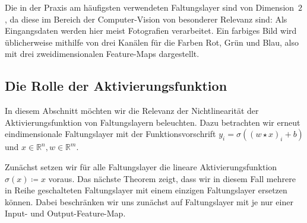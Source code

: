 \documentclass[paper=a4, 	%
		fontsize=11pt,
		abstract=true, 	%
		headsepline, 	%
		notitlepage	%
		]{scrartcl}
\theoremstyle{definition}
\newcommand{\R}{\mathbb{R}}
\begin{document}
\medskip

Die in der Praxis am häufigsten verwendeten Faltungslayer sind von Dimension~$2$, da diese im Bereich der Computer-Vision von besonderer Relevanz sind:
Als Eingangsdaten werden hier meist Fotografien verarbeitet.
Ein farbiges Bild wird üblicherweise mithilfe von drei Kanälen für die Farben Rot, Grün und Blau, also mit drei zweidimensionalen Feature-Maps dargestellt.

\subsection{Die Rolle der Aktivierungsfunktion}

In diesem Abschnitt möchten wir die Relevanz der Nichtlinearität der Aktivierungsfunktion von Faltungslayern beleuchten.
Dazu betrachten wir erneut eindimensionale Faltungslayer mit der Funktionsvorschrift $y_i = \sigma( (w\star x)_i + b )$ und $x\in\R^n, w\in\R^m$.


Zunächst setzen wir für alle Faltungslayer die lineare Aktivierungsfunktion $\sigma(x) \coloneqq x$ voraus.
Das nächste Theorem zeigt, dass wir in diesem Fall mehrere in Reihe geschalteten Faltungslayer mit einem einzigen Faltungslayer ersetzen können.
Dabei beschränken wir uns zunächst auf Faltungslayer mit je nur einer Input- und Output-Feature-Map.
\end{document}
